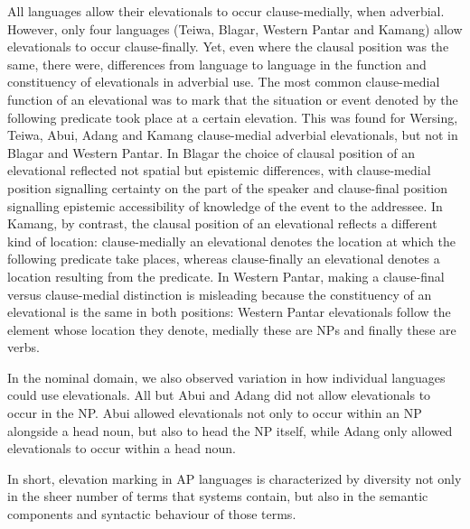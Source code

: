 All languages allow their elevationals to occur clause-medially, when adverbial. However, only four languages (Teiwa, Blagar, Western Pantar and Kamang) allow elevationals to occur clause-finally. Yet, even where the clausal position was the same, there were, differences from language to language in the function and constituency of elevationals in adverbial use. The most common clause-medial function of an elevational was to mark that the situation or event denoted by the following predicate took place at a certain elevation. This was found for Wersing, Teiwa, Abui, Adang and Kamang clause-medial adverbial elevationals, but not in Blagar and Western Pantar. In Blagar the choice of clausal position of an elevational reflected not spatial but epistemic differences, with clause-medial position signalling certainty on the part of the speaker and clause-final position signalling epistemic accessibility of knowledge of the event to the addressee. In Kamang, by contrast, the clausal position of an elevational reflects a different kind of location: clause-medially an elevational denotes the location at which the following predicate take places, whereas clause-finally an elevational denotes a location resulting from the predicate. In Western Pantar, making a clause-final versus clause{}-medial distinction is misleading because the constituency of an elevational is the same in both positions: Western Pantar elevationals follow the element whose location they denote, medially these are NPs and finally these are verbs. 

In the nominal domain, we also observed variation in how individual languages could use elevationals. All but Abui and Adang did not allow elevationals to occur in the NP. Abui allowed elevationals not only to occur within an NP alongside a head noun, but also to head the NP itself, while Adang only allowed elevationals to occur within a head noun.

In short, elevation marking in AP languages is characterized by diversity not only in the sheer number of terms that systems contain, but also in the semantic components and syntactic behaviour of those terms. 

